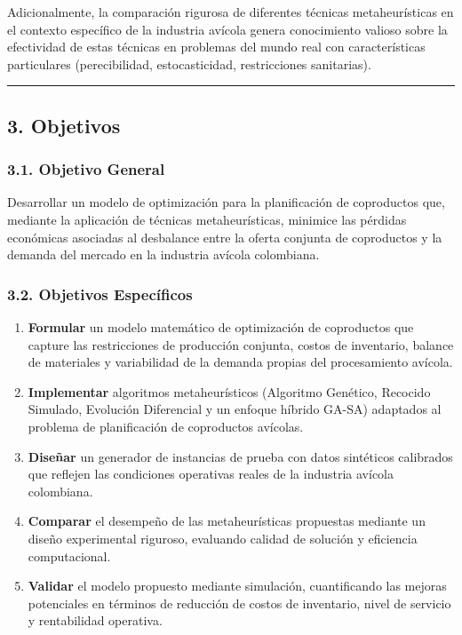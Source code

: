 \documentclass[
  spanish,
  12pt,
]{article}
\begin{document}
Adicionalmente, la comparación rigurosa de diferentes técnicas
metaheurísticas en el contexto específico de la industria avícola genera
conocimiento valioso sobre la efectividad de estas técnicas en problemas
del mundo real con características particulares (perecibilidad,
estocasticidad, restricciones sanitarias).

\begin{center}\rule{0.5\linewidth}{0.5pt}\end{center}

\subsection{3. Objetivos}\label{objetivos}

\subsubsection{3.1. Objetivo General}\label{objetivo-general}

Desarrollar un modelo de optimización para la planificación de
coproductos que, mediante la aplicación de técnicas metaheurísticas,
minimice las pérdidas económicas asociadas al desbalance entre la oferta
conjunta de coproductos y la demanda del mercado en la industria avícola
colombiana.

\subsubsection{3.2. Objetivos
Específicos}\label{objetivos-especuxedficos}

\begin{enumerate}
\def\labelenumi{\arabic{enumi}.}
\item
  \textbf{Formular} un modelo matemático de optimización de coproductos
  que capture las restricciones de producción conjunta, costos de
  inventario, balance de materiales y variabilidad de la demanda propias
  del procesamiento avícola.
\item
  \textbf{Implementar} algoritmos metaheurísticos (Algoritmo Genético,
  Recocido Simulado, Evolución Diferencial y un enfoque híbrido GA-SA)
  adaptados al problema de planificación de coproductos avícolas.
\item
  \textbf{Diseñar} un generador de instancias de prueba con datos
  sintéticos calibrados que reflejen las condiciones operativas reales
  de la industria avícola colombiana.
\item
  \textbf{Comparar} el desempeño de las metaheurísticas propuestas
  mediante un diseño experimental riguroso, evaluando calidad de
  solución y eficiencia computacional.
\item
  \textbf{Validar} el modelo propuesto mediante simulación,
  cuantificando las mejoras potenciales en términos de reducción de
  costos de inventario, nivel de servicio y rentabilidad operativa.
\end{enumerate}
\end{document}
